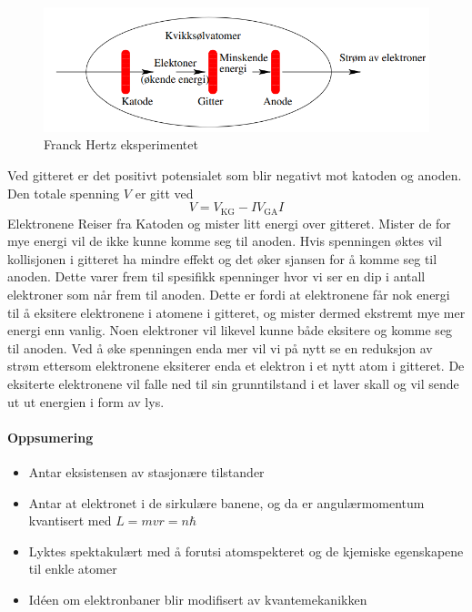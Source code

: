 \begin{figure}[h!]
  \centering
  \includegraphics[scale = .7]{Figures/Franck-Hertz Eksperiment.png}
  \caption{Franck Hertz eksperimentet}
  \label{fig: Frank Hertz}
\end{figure}
Ved gitteret er det positivt potensialet som blir negativt mot katoden og anoden. Den totale spenning $V$ er gitt ved 
\[
V = V_{\text{KG}} - I V_{\text{GA}}I
\]
Elektronene Reiser fra Katoden og mister litt energi over gitteret. Mister de for mye energi vil de ikke kunne komme seg til anoden. Hvis spenningen øktes vil kollisjonen i gitteret ha mindre effekt og det øker sjansen for å komme seg til anoden. Dette varer frem til spesifikk spenninger hvor vi ser en dip i antall elektroner som når frem til anoden. Dette er fordi at elektronene får nok energi til å eksitere elektronene i atomene i gitteret, og mister dermed ekstremt mye mer energi enn vanlig. Noen elektroner vil likevel kunne både eksitere og komme seg til anoden. Ved å øke spenningen enda mer vil vi på nytt se en reduksjon av strøm ettersom elektronene eksiterer enda et elektron i et nytt atom i gitteret. De eksiterte elektronene vil falle ned til sin grunntilstand i et laver skall og vil sende ut ut energien i form av lys. 

\paragraph{Oppsumering}
\begin{itemize}
    \item Antar eksistensen av stasjonære tilstander
    \item Antar at elektronet i de sirkulære banene, og da er angulærmomentum kvantisert med $L = mvr = n ℏ$
    \item Lyktes spektakulært med å forutsi atomspekteret og de kjemiske egenskapene til enkle atomer 
    \item Idéen om elektronbaner blir modifisert av kvantemekanikken
\end{itemize}
